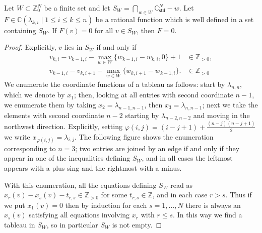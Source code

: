 \documentclass[11pt,fleqn]{article}
\newcommand\CC{\mathbb C}
\newcommand\ZZ{\mathbb Z}
\renewcommand\phi{\varphi}
\newcommand\std{\mathsf{std}}
\begin{document}
\begin{Lemma*}
Let $W \subset \ZZ^N_0$ be a finite set and let $S_W = \bigcap_{w \in W} 
\CC^N_\std - w$. Let $F \in \CC(\lambda_{k,i} \mid 1 \leq i \leq k \leq n)$ be 
a rational function which is well defined in a set containing $S_W$. If $F(v) 
= 0$ for all $v \in S_W$, then $F = 0$.
\end{Lemma*}
\begin{proof}
Explicitly, $v$ lies in $S_W$ if and only if
\begin{align*}
v_{k,i} - v_{k-1,i} - \max_{w \in W}\{w_{k-1,i} - w_{k,i}, 0\} +1 
	&\in \ZZ_{> 0}, \\
v_{k-1,i} - v_{k,i+1} - \max_{w \in W}\{w_{k,i+1} - w_{k-1,i}\}.
	&\in \ZZ_{>0} 
\end{align*}
We enumerate the coordinate functions of a tableau as follows: start by 
$\lambda_{n,n}$, which we denote by $x_1$; then, looking at all entries with 
second coordinate $n-1$, we enumerate them by taking $x_2 = 
\lambda_{n-1,n-1}$, then $x_3 = \lambda_{n,n-1}$; next we take the elements 
with second coordinate $n-2$ starting by $\lambda_{n-2,n-2}$ and moving in the 
northwest direction. Explicitly, setting $\phi(i,j) = (i-j+1) + 
\frac{(n-j)(n-j+1)}{2}$ we write $x_{\phi(i,j)} = \lambda_{i,j}$. The 
following figure shows the enumeration corresponding to $n = 3$; two entries 
are joined by an edge if and only if they appear in one of the inequalities 
defining $S_W$, and in all cases the leftmost appears with a plus sing and the 
rightmost with a minus.


With this enumeration, all the equations defining $S_W$ read as $x_r(v) - 
x_s(v) - t_{r,s} \in \ZZ_{>0}$ for some $t_{r,s} \in \ZZ$, and in each case 
$r > s$. Thus if we put $x_1(v) = 0$ then by induction for each $s = 1, 
\ldots, N$ there is always an $x_s(v)$ satisfying all equations involving 
$x_r$ with $r\leq s$. In this way we find a tableau in $S_W$, so in particular 
$S_W$ is not empty. 


\end{proof}
\end{document}
